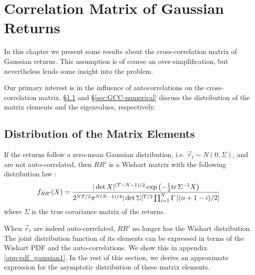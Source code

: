 \chapter{Correlation Matrix of Gaussian Returns}\label{chp:Gaussian}
In this chapter we present some results about the cross-correlation
matrix of Gaussian returns. This assumption is of course an
over-simplification, but nevertheless lends some insight into the
problem.

Our primary interest is in the influence of autocorrelations on the
cross-correlation matrix. \S\ref{sec:GCC-analytical} and
\S\ref{sec:GCC-numerical} discuss the distribution of the matrix
elements and the eigenvalues, respectively.

\section{Distribution of the Matrix Elements}\label{sec:GCC-analytical}
If the returns follow a zero-mean Gaussian distribution, 
i.e. $\vec{r}_t \sim N(0, \Sigma)$, and are not
auto-correlated, then $RR'$ is a Wishart matrix with
the following distribution law \cite{Anderson2003}:
\begin{equation}
  \label{eq:WishartPDF}
  f_{RR'}(X) = { |\det X|^{(T-N-1)/2} \exp\left(-{1 \over 2}\text{tr}\,
      \Sigma^{-1}X \right)
    \over
    2^{NT/2}\pi^{N(N-1)/4}|\det \Sigma|^{T/2}
    \prod_{i=1}^N \Gamma\left[(n+1-i)/2\right]
  }
\end{equation}
where $\Sigma$ is the true covariance matrix of the returns.

When $\vec{r}_t$ are indeed auto-correlated, $RR'$ no longer has the
Wishart distribution. The joint distribution function of its elements
can be expressed in terms of the Wishart PDF and the
auto-correlations. We show this in appendix
\ref{app:pdf_gaussian1}. In the rest of this section, we derive an
approximate expression for the asymptotic distribution of these matrix
elements.

